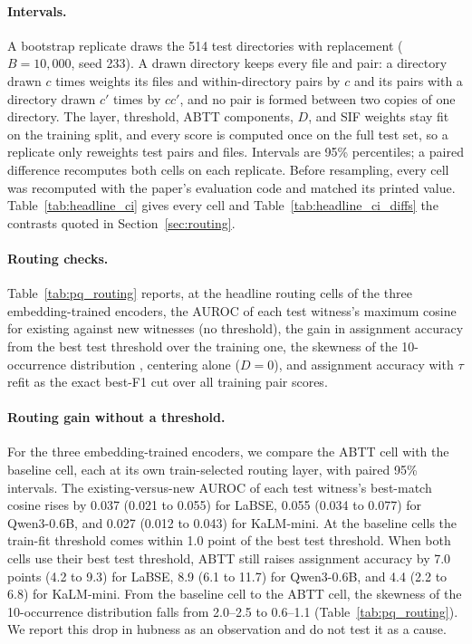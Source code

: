 \documentclass[11pt]{article}
\begin{document}
\paragraph{Intervals.} A bootstrap replicate draws the 514 test directories with replacement ($B=10{,}000$, seed 233). A drawn directory keeps every file and pair: a directory drawn $c$ times weights its files and within-directory pairs by $c$ and its pairs with a directory drawn $c'$ times by $cc'$, and no pair is formed between two copies of one directory. The layer, threshold, ABTT components, $D$, and SIF weights stay fit on the training split, and every score is computed once on the full test set, so a replicate only reweights test pairs and files. Intervals are 95\% percentiles; a paired difference recomputes both cells on each replicate. Before resampling, every cell was recomputed with the paper's evaluation code and matched its printed value. Table~\ref{tab:headline_ci} gives every cell and Table~\ref{tab:headline_ci_diffs} the contrasts quoted in Section~\ref{sec:routing}.

\paragraph{Routing checks.} Table~\ref{tab:pq_routing} reports, at the headline routing cells of the three embedding-trained encoders, the AUROC of each test witness's maximum cosine for existing against new witnesses (no threshold), the gain in assignment accuracy from the best test threshold over the training one, the skewness of the 10-occurrence distribution \citep{radovanovic2010hubs}, centering alone ($D=0$), and assignment accuracy with $\tau$ refit as the exact best-F1 cut over all training pair scores.

\paragraph{Routing gain without a threshold.}
\label{app:routing_no_threshold}
For the three embedding-trained encoders, we compare the ABTT cell with the baseline cell, each at its own train-selected routing layer, with paired 95\% intervals.
The existing-versus-new AUROC of each test witness's best-match cosine rises by 0.037 (0.021 to 0.055) for LaBSE, 0.055 (0.034 to 0.077) for Qwen3-0.6B, and 0.027 (0.012 to 0.043) for KaLM-mini.
At the baseline cells the train-fit threshold comes within 1.0 point of the best test threshold.
When both cells use their best test threshold, ABTT still raises assignment accuracy by 7.0 points (4.2 to 9.3) for LaBSE, 8.9 (6.1 to 11.7) for Qwen3-0.6B, and 4.4 (2.2 to 6.8) for KaLM-mini.
From the baseline cell to the ABTT cell, the skewness of the 10-occurrence distribution falls from 2.0--2.5 to 0.6--1.1 (Table~\ref{tab:pq_routing}).
We report this drop in hubness as an observation and do not test it as a cause.
\end{document}
